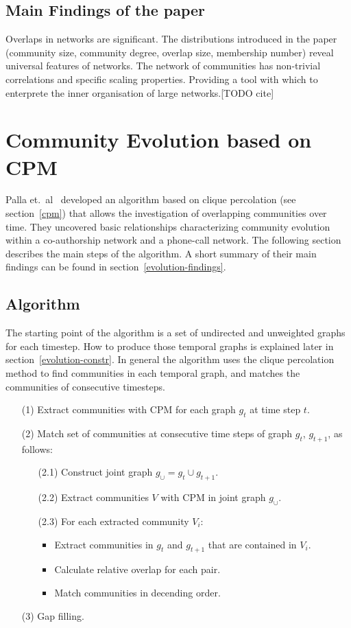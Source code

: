 \documentclass[runningheads,a4paper]{llncs}
\begin{document}
\subsection{Main Findings of the paper}
Overlaps in networks are significant. The distributions introduced in the paper (community size, community degree, overlap size, membership number) reveal universal features of networks. The network of communities has non-trivial correlations and specific scaling properties. Providing a tool with which to enterprete the inner organisation of large networks.[TODO cite]

\section{Community Evolution based on CPM}
\label{evolution}
Palla et.~al~\cite{palla2007quantifying} developed an algorithm based on clique percolation (see section~\ref{cpm}) that allows the investigation of overlapping communities over time. They uncovered basic relationships characterizing community evolution within a co-authorship network and a phone-call network. The following section describes the main steps of the algorithm. A short summary of their main findings can be found in section~\ref{evolution-findings}.

\subsection{Algorithm}
\label{evolution-algo}
The starting point of the algorithm is a set of undirected and unweighted  graphs for each timestep.
How to produce those temporal graphs is explained later in section~\ref{evolution-constr}.
In general the algorithm uses the clique percolation method to find communities in each temporal graph, and matches the communities of consecutive timesteps.

\begin{enumerate}
\small
\item[(1)] Extract communities with CPM for each graph $g_t$ at time step $t$.
\item[(2)] Match set of communities at consecutive time steps of graph $g_t$, $g_{t+1}$, as follows:
	\begin{enumerate}
		\item[(2.1)] Construct joint graph $g_{\cup}=g_t \cup g_{t+1}$.
		\item[(2.2)] Extract communities $V$ with CPM in joint graph $g_{\cup}$.
		\item[(2.3)] For each extracted community $V_i$: 
		\begin{itemize}
			\item Extract communities in $g_t$ and $g_{t+1}$ that are contained in $V_i$.
			\item Calculate relative overlap for each pair.
			\item Match communities in decending order.
		\end{itemize}
	\end{enumerate}
\item[(3)] Gap filling.
\end{enumerate}
\end{document}
